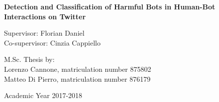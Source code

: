 {\begin{center}
\vspace{1cm} 
\LARGE
\textbf{Detection and Classification of Harmful Bots in Human-Bot Interactions on Twitter}\\


\vspace{2.0cm}

\end{center}


\vspace{3.0cm} 
\large
\begin{flushleft}
Supervisor: Florian Daniel\\
Co-supervisor: Cinzia Cappiello
\end{flushleft}

\vspace{1.0cm}

\begin{flushright}
M.Sc. Thesis by: \\ 
{Lorenzo Cannone}, matriculation number 875802 \\ 
{Matteo Di Pierro}, matriculation number 876179 \\
\end{flushright}

\vspace{2cm}

\begin{center}
Academic Year 2017-2018
\end{center} 

\clearpage
}

